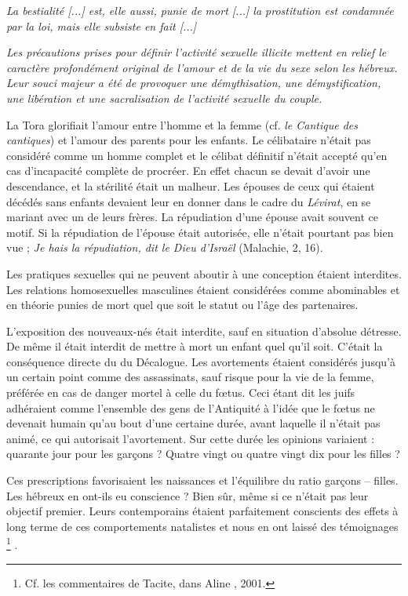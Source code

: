 \begin{displayquote}
{ \emph{La bestialité \emph{[...]} est, elle aussi, punie de mort \emph{[...]} la prostitution est condamnée par la loi, mais elle subsiste en fait \emph{[...]}}

 \emph{Les précautions prises pour définir l'activité sexuelle illicite mettent en relief le caractère profondément original de l'amour et de la vie du sexe selon les hébreux. Leur souci majeur a été de provoquer une démythisation, une démystification, une libération et une sacralisation de l'activité sexuelle du couple.}
}%
\end{displayquote}

 La Tora glorifiait l'amour entre l'homme et la femme (cf. \emph{le Cantique des cantiques}) et l'amour des parents pour les enfants. Le célibataire n'était pas considéré comme un homme complet et le célibat définitif n'était accepté qu'en cas d'incapacité complète de procréer. En effet chacun se devait d'avoir une descendance, et la stérilité était un malheur. Les épouses de ceux qui étaient décédés sans enfants devaient leur en donner dans le cadre du \emph{Lévirat}, en se mariant avec un de leurs frères. La répudiation d'une épouse avait souvent ce motif. Si la répudiation de l'épouse était autorisée, elle n'était pourtant pas bien vue ; \emph{Je hais la répudiation, dit le Dieu d'Israël} (Malachie, 2, 16).

 Les pratiques sexuelles qui ne peuvent aboutir à une conception étaient interdites. Les relations homosexuelles masculines étaient considérées comme abominables et en théorie punies de mort quel que soit le statut ou l'âge des partenaires. 

 L'exposition des nouveaux-nés était interdite, sauf en situation d'absolue détresse. De même il était interdit de mettre à mort un enfant quel qu'il soit. C'était la conséquence directe du  du Décalogue. Les avortements étaient considérés jusqu'à un certain point comme des assassinats, sauf risque pour la vie de la femme, préférée en cas de danger mortel à celle du fœtus. Ceci étant dit les juifs adhéraient comme l'ensemble des gens de l'Antiquité à l'idée que le fœtus ne devenait humain qu'au bout d'une certaine durée, avant laquelle il n'était pas animé, ce qui autorisait l'avortement. Sur cette durée les opinions variaient : quarante jour pour les garçons ? Quatre vingt ou quatre vingt dix pour les filles ? 

 Ces prescriptions favorisaient les naissances et l'équilibre du ratio garçons -- filles. Les hébreux en ont-ils eu conscience ? Bien sûr, même si ce n'était pas leur objectif premier. Leurs contemporains étaient parfaitement conscients des effets à long terme de ces comportements natalistes et nous en ont laissé des témoignages%
\footnote{Cf. les commentaires de Tacite, dans Aline , 2001.}%
.

